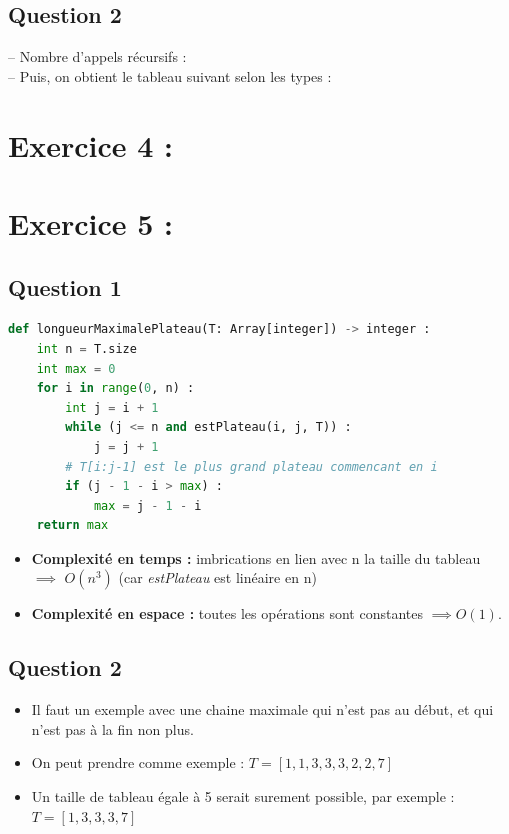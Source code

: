 \documentclass{article}
\begin{document}
\subsection*{Question 2}
-- Nombre d'appels récursifs : 
\\
-- Puis, on obtient le tableau suivant selon les types : 

\section*{\textbf{Exercice 4 :}}

\section*{\textbf{Exercice 5 :}}

\subsection*{Question 1}
\begin{lstlisting}[language=Python, caption={fonction \textit{longueurMaximalePlateau}}]
def longueurMaximalePlateau(T: Array[integer]) -> integer :
    int n = T.size
    int max = 0
    for i in range(0, n) :
        int j = i + 1
        while (j <= n and estPlateau(i, j, T)) :
            j = j + 1
        # T[i:j-1] est le plus grand plateau commencant en i
        if (j - 1 - i > max) :
            max = j - 1 - i
    return max
\end{lstlisting}

\begin{itemize}
    \item \textbf{Complexité en temps :} 
     imbrications en lien avec n la taille du tableau $\implies$ $O(n^3)$ (car \textit{estPlateau} est linéaire en n)
    \item \textbf{Complexité en espace :}
    \subitem toutes les opérations sont constantes $\implies O(1)$.
\end{itemize}

\subsection*{Question 2}
\begin{itemize}
    \item Il faut un exemple avec une chaine maximale qui n'est pas au début, et qui n'est pas à la fin non plus.
    \item On peut prendre comme exemple : $T = [1, 1, 3, 3, 3, 2, 2, 7]$
    \item Un taille de tableau égale à 5 serait surement possible, par exemple : $T = [1, 3, 3, 3, 7]$
\end{itemize}
\end{document}
